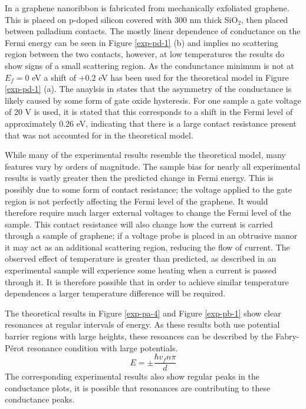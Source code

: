		In \cite{b22} a graphene nanoribbon is fabricated from mechanically exfoliated graphene. This is placed on p-doped silicon covered with 300 nm thick SiO$_{2}$, then placed between palladium contacts. The mostly linear dependence of conductance on the Fermi energy can be seen in Figure \ref{exp-pd-1} (b) and implies no scattering region between the two contacts, however, at low temperatures the results do show signs of a small scattering region. As the condunctance minimum is not at $E_{f}=0$ eV a shift of $+0.2$ eV has been used for the theoretical model in Figure \ref{exp-pd-1} (a).  The anaylsis in \cite{b22} states that the asymmetry of the conductance is likely caused by some form of gate oxide hysteresis. For one sample a gate voltage of 20 V is used, it is stated that this corresponds to a shift in the Fermi level of approximately 0.26 eV, indicating that there is a large contact resistance present that was not accounted for in the theoretical model.

		While many of the experimental results resemble the theoretical model, many features vary by orders of magnitude. The sample bias for nearly all experimental results is vastly greater then the predicted change in Fermi energy. This is possibly due to some form of contact resistance; the voltage applied to the gate region is not perfectly affecting the Fermi level of the graphene. It would therefore require much larger external voltages to change the Fermi level of the sample. This contact resistance will also change how the current is carried through a sample of graphene; if a voltage probe is placed in an obtrusive manor it may act as an additional scattering region, reducing the flow of current. The observed effect of temperature is greater than predicted, as described in \cite{b19} an experimental sample will experience some heating when a current is passed through it. It is therefore possible that in order to achieve similar temperature dependences a larger temperature difference will be required.

		The theoretical results in Figure \ref{exp-pa-4} and Figure \ref{exp-pb-1} show clear resonances at regular intervals of energy. As these results both use potential barrier regions with large heights, these resoances can be described by the Fabry-P\'{e}rot resonance condition with large potentials.
			\begin{equation}
				E=\pm \frac{\hbar v_{f}n \pi}{d}
			\end{equation}
		The corresponding experimental results also show regular peaks in the conductance plots, it is possible that resonances are contributing to these conductance peaks.

%
